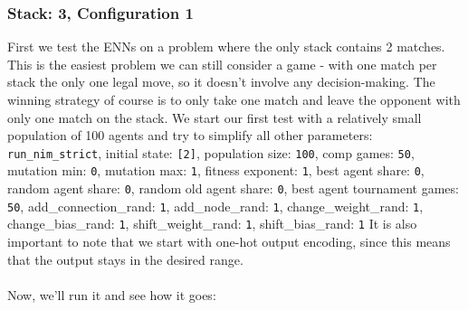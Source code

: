 \documentclass[11pt]{report}
\begin{document}
\begin{enumerate}
                \subsubsection{Stack: 3, Configuration 1}
    First we test the ENNs on a problem where the only stack contains 2 matches.
    This is the easiest problem we can still consider a game - with one match per stack the only one legal move, so it doesn't involve any decision-making.
    The winning strategy of course is to only take one match and leave the opponent with only one match on the stack.
    We start our first test with a relatively small population of 100 agents and try to simplify all other parameters:
    \\
    \texttt{run\_nim\_strict}, initial state: \texttt{[2]}, population size: \texttt{100}, comp games: \texttt{50}, mutation min: \texttt{0}, mutation max: \texttt{1}, fitness exponent: \texttt{1}, best agent share:
    \texttt{0}, random agent share: \texttt{0}, random old agent share: \texttt{0}, best agent tournament games: \texttt{50}, add\_connection\_rand: \texttt{1}, add\_node\_rand: \texttt{1}, change\_weight\_rand: \texttt{1}, change\_bias\_rand: \texttt{1}, shift\_weight\_rand: \texttt{1}, shift\_bias\_rand: \texttt{1}
    It is also important to note that we start with one-hot output encoding, since this means that the output stays in the desired range.
    \\ \\
    Now, we'll run it and see how it goes:
    \\
    \newcommand{\csvpath}{../data/simple_nim/stack_2/t_1/stats.csv} %
    \begin{center}
\end{center}
\end{enumerate}
\end{document}
